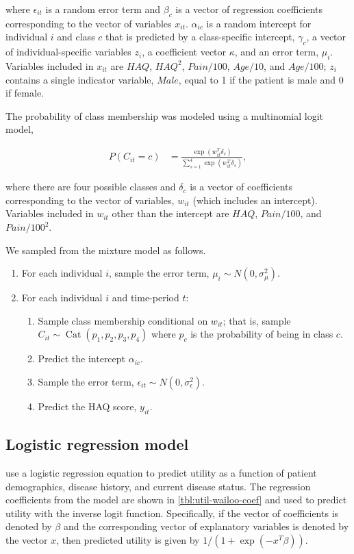 \documentclass[11pt,final,fleqn]{article}\usepackage[]{graphicx}\usepackage[]{color}
\theoremstyle{plain}
\DeclareMathOperator{\Cat}{Cat}
\begin{document}
\begin{appendices}
where $\epsilon_{it}$ is a random error term and $\beta_{c}$ is a vector of regression coefficients corresponding to the vector of variables $x_{it}$. $\alpha_{ic}$ is a random intercept for individual $i$ and class $c$ that is predicted by a class-specific intercept, $\gamma_c$, a vector of individual-specific variables $z_{i}$, a coefficient vector $\kappa$, and an error term, $\mu_i$. Variables included in $x_{it}$ are $HAQ$, $HAQ^2$, $Pain/100$, $Age/10$, and $Age/100$; $z_{i}$ contains a single indicator variable, $Male$, equal to 1 if the patient is male and 0 if female.

The probability of class membership was modeled using a multinomial logit model,

\begin{align}
P(C_{it} = c) &= \frac{\exp(w_{it}^T\delta_c)}{\sum_{s=1}^{4}\exp(w_{it}^T\delta_s)},
\end{align}

where there are four possible classes and $\delta_c$ is a vector of coefficients corresponding to the vector of variables, $w_{it}$ (which includes an intercept). Variables included in $w_{it}$ other than the intercept are $HAQ$, $Pain/100$, and $Pain/100^2$.

We sampled from the mixture model as follows.

\begin{enumerate}
\item For each individual $i$, sample the error term, $\mu_{i} \sim N(0, \sigma^2_\mu)$.
\item For each individual $i$ and time-period $t$: 
\begin{enumerate}
\item Sample class membership conditional on $w_{it}$; that is, sample $C_{it} \sim \Cat(p_1, p_2, p_3, p_4)$ where $p_c$ is the probability of being in class $c$.
\item Predict the intercept $\alpha_{ic}$.
\item Sample the error term, $\epsilon_{it} \sim N(0, \sigma^2_\epsilon)$.
\item Predict the HAQ score, $y_{it}$. 
\end{enumerate}
\end{enumerate}

\subsection{Logistic regression model}\label{app:sim-utility-logistic}
\citet{wailoo2006modeling} use a logistic regression equation to predict utility as a function of patient demographics, disease history, and current disease status. The regression coefficients from the model are shown in \autoref{tbl:util-wailoo-coef} and used to predict utility with the inverse logit function. Specifically, if the vector of coefficients is denoted by $\beta$ and the corresponding vector of explanatory variables is denoted by the vector $x$, then predicted utility is given by $1/(1 + \exp(-x^T\beta))$.




\end{appendices}
\end{document}
